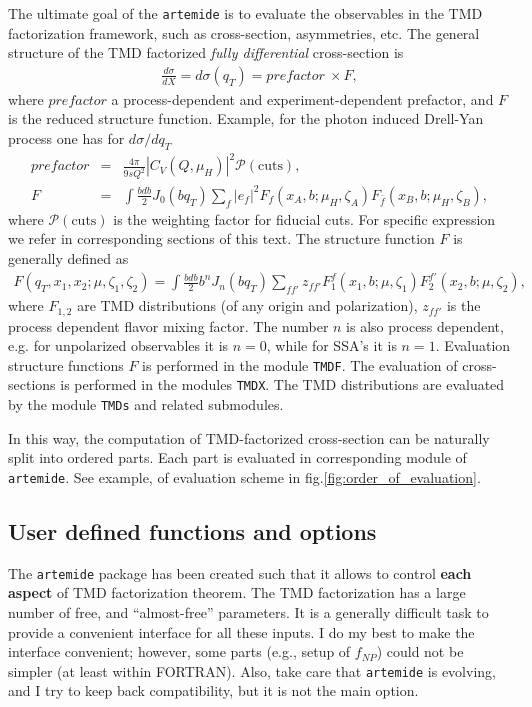 \documentclass[prd,nofootinbib,eqsecnum,final]{revtex4}
\renewcommand{\(}{\left(}
\renewcommand{\)}{\right)}
\renewcommand{\[}{\left[}
\renewcommand{\]}{\right]}
\begin{document}
The ultimate goal of the \texttt{artemide} is to evaluate the observables in the TMD factorization framework, such as cross-section, asymmetries, etc. The general structure of the TMD factorized \textit{fully differential} cross-section  is
\begin{eqnarray}
\frac{d\sigma}{dX}=
d\sigma(q_T)=prefactor~\times F,
\end{eqnarray}
where 
$prefactor$ a process-dependent and experiment-dependent prefactor, and $F$ is the reduced structure function. Example, for the photon induced Drell-Yan process one has for $d\sigma/dq_T$
\begin{eqnarray*}
prefactor&=&\frac{4\pi}{9sQ^2}|C_V(Q,\mu_H)|^2 \mathcal{P}(\text{cuts}),
\\
F&=&\int \frac{bdb}{2}J_0(bq_T)\sum_{f}|e_f|^2F_{f}(x_A,b;\mu_H,\zeta_A)F_{\bar f}(x_B,b;\mu_H,\zeta_B),
\end{eqnarray*}
where $\mathcal{P}(\text{cuts})$ is the weighting factor for fiducial cuts. For specific expression we refer in corresponding sections of this text. The structure function $F$ is generally defined as
\begin{eqnarray}
F(q_T,x_1,x_2;\mu,\zeta_1,\zeta_2)=\int \frac{b db}{2}b^{n}J_n(b q_T)\sum_{ff'} z_{ff'} F^f_1(x_1,b;\mu,\zeta_1)F^{f'}_2(x_2,b;\mu,\zeta_2),
\end{eqnarray}
where $F_{1,2}$ are TMD distributions (of any origin and polarization), $z_{ff'}$ is the process dependent flavor mixing factor. The number $n$ is also process dependent, e.g. for unpolarized observables it is $n=0$, while for SSA's it is $n=1$. Evaluation structure functions $F$ is performed in the module \texttt{TMDF}. The evaluation of cross-sections is performed in the modules \texttt{TMDX}. The TMD distributions are evaluated by the module \texttt{TMDs} and related submodules.

\begin{tcolorbox}
In this way, the computation of TMD-factorized cross-section can be naturally split into ordered parts. Each part is evaluated in corresponding module of \texttt{artemide}. See example, of evaluation scheme in fig.\ref{fig:order_of_evaluation}.
\end{tcolorbox}

\subsection{User defined functions and options}

\begin{tcolorbox}
The \texttt{artemide} package has been created such that it allows to control \textbf{each aspect} of TMD factorization theorem. The TMD factorization has a large number of free, and ``almost-free'' parameters. It is a generally difficult task to provide a convenient interface for all these inputs. I do my best to make the interface convenient; however, some parts (e.g., setup of $f_{NP}$) could not be simpler (at least within FORTRAN). Also, take care that \texttt{artemide} is evolving, and I try to keep back compatibility, but it is not the main option.
\end{tcolorbox}
\end{document}

